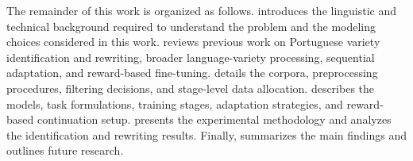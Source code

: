 The remainder of this work is organized as follows.
 introduces the linguistic and technical background required
to understand the problem and the modeling choices considered in this work.
 reviews previous work on Portuguese variety
identification and rewriting, broader language-variety processing, sequential
adaptation, and reward-based fine-tuning.  details the
corpora, preprocessing procedures, filtering decisions, and stage-level data
allocation.  describes the models, task formulations,
training stages, adaptation strategies, and reward-based continuation setup.
 presents the experimental methodology and analyzes the
identification and rewriting results. Finally, 
summarizes the main findings and outlines future research.
